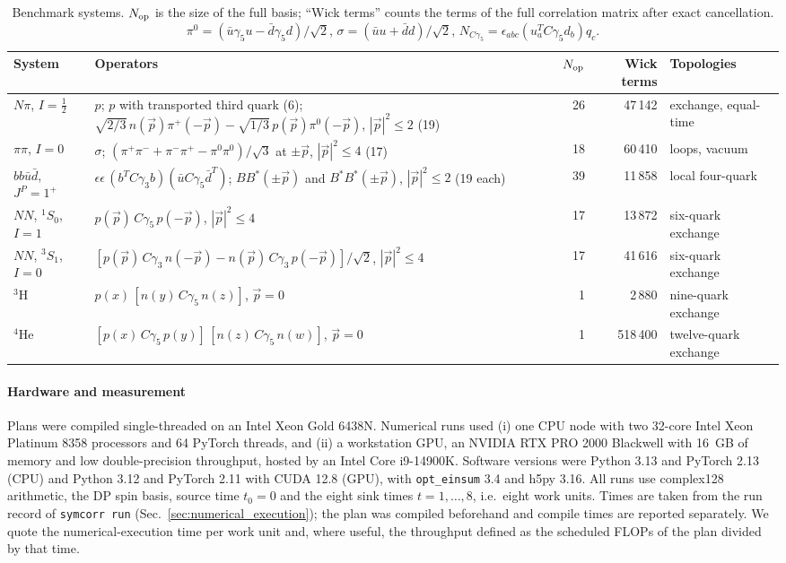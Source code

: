 \documentclass[a4paper,fleqn]{cas-dc}
\begin{document}
\begin{table}[t]
\centering
\caption{Benchmark systems. \(N_{\rm op}\) is the size of the full basis; ``Wick
terms'' counts the terms of the full correlation matrix after exact cancellation.
\(\pi^0=(\bar u\gamma_5u-\bar d\gamma_5d)/\sqrt2\), \(\sigma=(\bar uu+\bar dd)/\sqrt2\),
\(N_{C\gamma_5}=\epsilon_{abc}(u_a^TC\gamma_5d_b)q_c\).}
\label{tab:benchmark_bases}
\footnotesize
\begin{tabular}{@{}lp{}rrl@{}}
\toprule
System & Operators & \(N_{\rm op}\) & Wick terms & Topologies \\
\midrule
\(N\pi\), \(I=\tfrac12\) & \(p\); \(p\) with transported third quark (6); \(\sqrt{2/3}\,n(\vec p)\pi^+(-\vec p)-\sqrt{1/3}\,p(\vec p)\pi^0(-\vec p)\), \(|\vec p|^2\le2\) (19) & 26 & 47\,142 & exchange, equal-time \\
\(\pi\pi\), \(I=0\) & \(\sigma\); \((\pi^+\pi^-+\pi^-\pi^+-\pi^0\pi^0)/\sqrt3\) at \(\pm\vec p\), \(|\vec p|^2\le4\) (17) & 18 & 60\,410 & loops, vacuum \\
\(bb\bar u\bar d\), \(J^P=1^+\) & \(\epsilon\epsilon\,(b^TC\gamma_3b)(\bar u C\gamma_5\bar d^T)\); \(B B^*(\pm\vec p)\) and \(B^*B^*(\pm\vec p)\), \(|\vec p|^2\le2\) (19 each) & 39 & 11\,858 & local four-quark \\
\(NN\), \(^1S_0\), \(I=1\) & \(p(\vec p)\,C\gamma_5\,p(-\vec p)\), \(|\vec p|^2\le4\) & 17 & 13\,872 & six-quark exchange \\
\(NN\), \(^3S_1\), \(I=0\) & \([p(\vec p)\,C\gamma_3\,n(-\vec p)-n(\vec p)\,C\gamma_3\,p(-\vec p)]/\sqrt2\), \(|\vec p|^2\le4\) & 17 & 41\,616 & six-quark exchange \\
\(^3\)H & \(p(x)\,[n(y)\,C\gamma_5\,n(z)]\), \(\vec p=0\) & 1 & 2\,880 & nine-quark exchange \\
\(^4\)He & \([p(x)\,C\gamma_5\,p(y)]\,[n(z)\,C\gamma_5\,n(w)]\), \(\vec p=0\) & 1 & 518\,400 & twelve-quark exchange \\
\bottomrule
\end{tabular}
\end{table}

\paragraph{Hardware and measurement}
Plans were compiled single-threaded on an Intel Xeon Gold 6438N. Numerical runs
used (i) one CPU node with two 32-core Intel Xeon Platinum 8358 processors and
64 PyTorch threads, and (ii) a workstation GPU, an NVIDIA RTX PRO 2000 Blackwell
with 16~GB of memory and low double-precision throughput, hosted by an Intel
Core i9-14900K. Software versions were Python 3.13 and PyTorch 2.13 (CPU) and
Python 3.12 and PyTorch 2.11 with CUDA 12.8 (GPU), with \texttt{opt\_einsum} 3.4
and h5py 3.16. All runs use complex128 arithmetic, the DP spin basis, source
time \(t_0=0\) and the eight sink times \(t=1,\dots,8\), i.e.\ eight work units.
Times are taken from the run record of \texttt{symcorr run}
(Sec.~\ref{sec:numerical_execution}); the plan was compiled beforehand and
compile times are reported separately. We quote the numerical-execution time per
work unit and, where useful, the throughput defined as the scheduled FLOPs of the
plan divided by that time.
\end{document}
